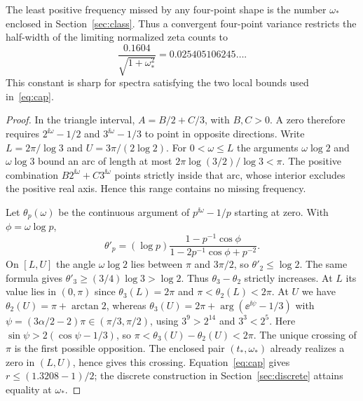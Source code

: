 \begin{proposition}\label{prop:firstres}
The least positive frequency missed by any four-point shape is the number
$\omega_*$ enclosed in Section~\ref{sec:class}. Thus a convergent four-point
variance restricts the half-width of the limiting normalized zeta counts to
\[
 \frac{0.1604}{\sqrt{1+\omega_*^2}}=0.025405106245\ldots .
\]
This constant is sharp for spectra satisfying the two local bounds used in~\eqref{eq:cap}.
\end{proposition}
\begin{proof}
In the triangle interval, $A=B/2+C/3$, with $B,C>0$. A zero therefore requires
$2^{\ii\omega}-1/2$ and $3^{\ii\omega}-1/3$ to point in opposite directions.
Write $L=2\pi/\log3$ and $U=3\pi/(2\log2)$. For $0<\omega\le L$ the arguments
$\omega\log2$ and $\omega\log3$ bound an arc of length at most
$2\pi\log(3/2)/\log3<\pi$. The positive combination
$B2^{\ii\omega}+C3^{\ii\omega}$ points strictly inside that arc, whose interior excludes
the positive real axis. Hence this range contains no missing frequency.

Let $\theta_p(\omega)$ be the continuous argument of
$p^{\ii\omega}-1/p$ starting at zero. With $\phi=\omega\log p$,
\[
 \theta'_p=(\log p)\frac{1-p^{-1}\cos\phi}{1-2p^{-1}\cos\phi+p^{-2}}.
\]
On $[L,U]$ the angle $\omega\log2$ lies between $\pi$ and $3\pi/2$,
so $\theta'_2\le\log2$. The same formula gives
$\theta'_3\ge(3/4)\log3>\log2$. Thus $\theta_3-\theta_2$ strictly increases.
At $L$ its value lies in $(0,\pi)$ since $\theta_3(L)=2\pi$ and
$\pi<\theta_2(L)<2\pi$. At $U$ we have $\theta_2(U)=\pi+\arctan 2$,
whereas $\theta_3(U)=2\pi+\arg(\ee^{\ii\psi}-1/3)$ with
$\psi=(3\alpha/2-2)\pi\in(\pi/3,\pi/2)$, using $3^9>2^{14}$
and $3^3<2^5$. Here $\sin\psi>2(\cos\psi-1/3)$, so
$\pi<\theta_3(U)-\theta_2(U)<2\pi$. The unique crossing of $\pi$
is the first possible opposition. The enclosed pair $(t_*,\omega_*)$
already realizes a zero in $(L,U)$, hence gives this crossing.
Equation~\eqref{eq:cap} gives $r\le(1.3208-1)/2$;
the discrete construction in Section~\ref{sec:discrete} attains equality at $\omega_*$.
\end{proof}
